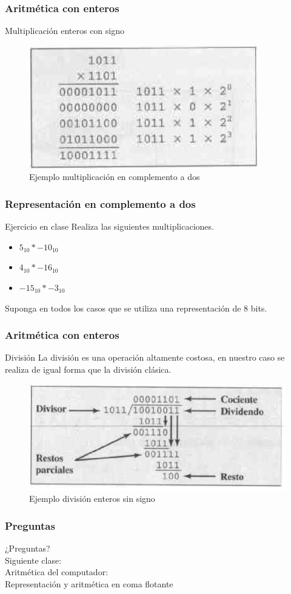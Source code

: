 \documentclass{beamer}
\begin{document}
\begin{frame}
	\frametitle{Aritmética con enteros}
	\begin{block}{Multiplicación enteros con signo}
	\begin{figure}[H]
		\centering
		\includegraphics[scale=0.6]{imagenes/multiplica.png}
		\caption{Ejemplo multiplicación en complemento a dos}
	\end{figure}
	\end{block}	
\end{frame}

\begin{frame}
	\frametitle{Representación en complemento a dos}
	\begin{block}{Ejercicio en clase}
	Realiza las siguientes multiplicaciones.
		\begin{itemize}
			\item $5_{10} * -10_{10}$
			\item $4_{10} * -16_{10}$
			\item $-15_{10} * -3_{10}$
		\end{itemize}
	Suponga en todos los casos que se utiliza una representación de 8 bits.
	\end{block}	
\end{frame}

\begin{frame}
	\frametitle{Aritmética con enteros}
	\begin{block}{División}
		La división es una operación altamente costosa, en nuestro caso se realiza de igual forma que la división clásica.
	\begin{figure}[H]
		\centering
		\includegraphics[scale=0.6]{imagenes/division.png}
		\caption{Ejemplo división enteros sin signo}
	\end{figure}
	\end{block}	
\end{frame}

\begin{frame}
	\frametitle{Preguntas}
	\vfill
	\begin{center}
	¿Preguntas?\\
	\vfill
	Siguiente clase: \\
	Aritmética del computador:\\
	Representación y aritmética en coma flotante
	\end{center}
\end{frame}
\end{document}

